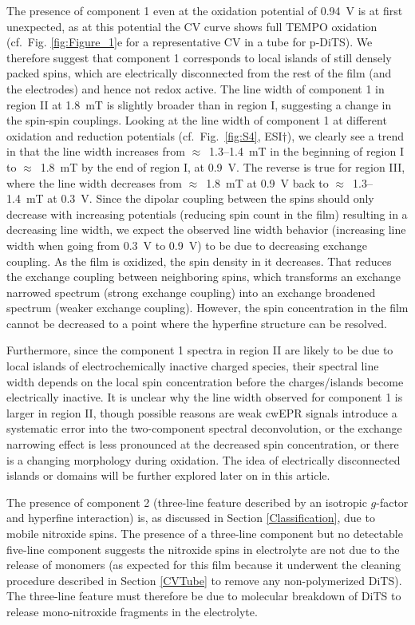 \par
The presence of component 1 even at the oxidation potential of 0.94~V is at first unexpected, as at this potential the CV curve shows full TEMPO oxidation (cf.\ Fig. \ref{fig:Figure_1}e for a representative CV in a tube for p-DiTS). We therefore suggest that component 1 corresponds to local islands of still densely packed spins, which are electrically disconnected from the rest of the film (and the electrodes) and hence not redox active. The line width of component 1 in region II at 1.8~mT is slightly broader than in region I, suggesting a change in the spin-spin couplings. Looking at the line width of component 1 at different oxidation and reduction potentials (cf.\ Fig.~\ref{fig:S4}, ESI$\dag$), we clearly see a trend in that the line width increases from $\approx$~1.3--1.4~mT in the beginning of region I to $\approx$~1.8~mT by the end of region I, at 0.9~V. The reverse is true for region III, where the line width decreases from $\approx$~1.8~mT at 0.9~V back to $\approx$~1.3--1.4~mT at 0.3~V. Since the dipolar coupling between the spins should only decrease with increasing potentials (reducing spin count in the film) resulting in a decreasing line width, we expect the observed line width behavior (increasing line width when going from 0.3~V to 0.9~V) to be due to decreasing exchange coupling. As the film is oxidized, the spin density in it decreases. That reduces the exchange coupling between neighboring spins, which transforms an exchange narrowed spectrum (strong exchange coupling) into an exchange broadened spectrum (weaker exchange coupling). However, the spin concentration in the film cannot be decreased to a point where the hyperfine structure can be resolved.

\par
Furthermore, since the component 1 spectra in region II are likely to be due to local islands of electrochemically inactive charged species, their spectral line width depends on the local spin concentration before the charges/islands become electrically inactive. It is unclear why the line width observed for component 1 is larger in region II, though possible reasons are weak cwEPR signals introduce a systematic error into the two-component spectral deconvolution, or the exchange narrowing effect is less pronounced at the decreased spin concentration, or there is a changing morphology during oxidation. The idea of electrically disconnected islands or domains will be further explored later on in this article.

\par
The presence of component 2 (three-line feature described by an isotropic $g$-factor and hyperfine interaction) is, as discussed in Section \ref{Classification}, due to mobile nitroxide spins. The presence of a three-line component but no detectable five-line component suggests the nitroxide spins in electrolyte are not due to the release of monomers (as expected for this film because it underwent the cleaning procedure described in Section \ref{CVTube} to remove any non-polymerized DiTS). The three-line feature must therefore be due to molecular breakdown of DiTS to release mono-nitroxide fragments in the electrolyte.

